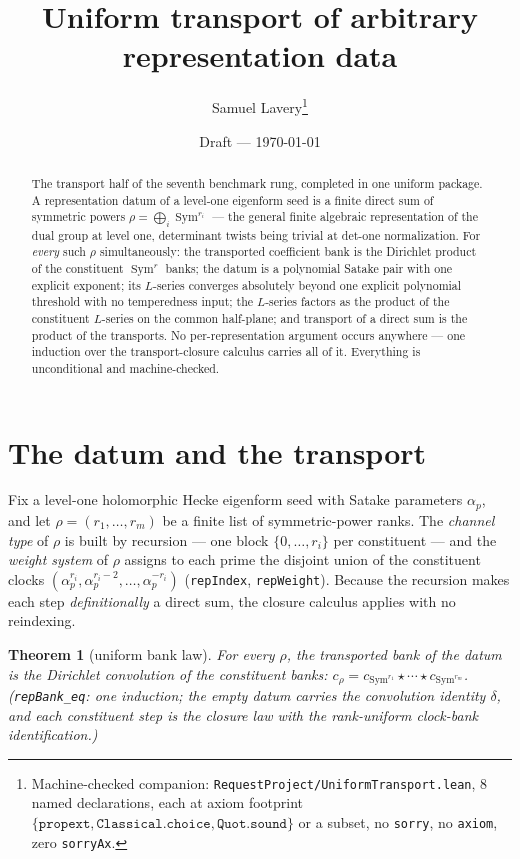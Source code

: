 \documentclass[11pt]{article}
\title{Uniform transport of arbitrary representation data}
\author{Samuel Lavery\thanks{Machine-checked companion:
\texttt{RequestProject/UniformTransport.lean}, 8 named declarations, each at axiom
footprint $\{\texttt{propext},\texttt{Classical.choice},\texttt{Quot.sound}\}$ or a
subset, no \texttt{sorry}, no \texttt{axiom}, zero \texttt{sorryAx}.}}
\date{Draft --- \today}
\newtheorem{theorem}{Theorem}
\newcommand{\Sym}{\operatorname{Sym}}
\begin{document}
\maketitle

\begin{abstract}
The transport half of the seventh benchmark rung, completed in one uniform package.  A
representation datum of a level-one eigenform seed is a finite direct sum of symmetric
powers $\rho=\bigoplus_i\Sym^{r_i}$ --- the general finite algebraic representation of the
dual group at level one, determinant twists being trivial at det-one normalization.  For
\emph{every} such $\rho$ simultaneously: the transported coefficient bank is the
Dirichlet product of the constituent $\Sym^{r}$ banks; the datum is a polynomial Satake
pair with one explicit exponent; its $L$-series converges absolutely beyond one explicit
polynomial threshold with no temperedness input; the $L$-series factors as the product of
the constituent $L$-series on the common half-plane; and transport of a direct sum is the
product of the transports.  No per-representation argument occurs anywhere --- one
induction over the transport-closure calculus carries all of it.  Everything is
unconditional and machine-checked.
\end{abstract}

\section{The datum and the transport}

Fix a level-one holomorphic Hecke eigenform seed with Satake parameters $\alpha_p$, and
let $\rho=(r_1,\dots,r_m)$ be a finite list of symmetric-power ranks.  The \emph{channel
type} of $\rho$ is built by recursion --- one block $\{0,\dots,r_i\}$ per constituent ---
and the \emph{weight system} of $\rho$ assigns to each prime the disjoint union of the
constituent clocks $(\alpha_p^{r_i},\alpha_p^{r_i-2},\dots,\alpha_p^{-r_i})$
(\texttt{repIndex}, \texttt{repWeight}).  Because the recursion makes each step
\emph{definitionally} a direct sum, the closure calculus applies with no reindexing.

\begin{theorem}[uniform bank law]\label{thm:bank}
For every $\rho$, the transported bank of the datum is the Dirichlet convolution of the
constituent banks: $c_\rho=c_{\Sym^{r_1}}\star\cdots\star c_{\Sym^{r_m}}$.
(\texttt{repBank\_eq}: one induction; the empty datum carries the convolution identity
$\delta$, and each constituent step is the closure law with the rank-uniform clock-bank
identification.)
\end{theorem}
\end{document}
